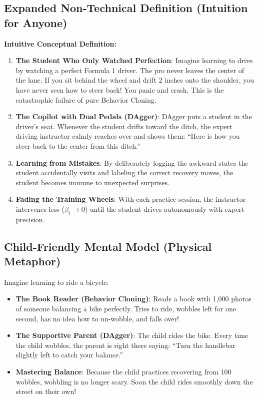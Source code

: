 \documentclass[11pt,a4paper]{article}
\theoremstyle{definition}
\begin{document}
\subsection{Expanded Non-Technical Definition (Intuition for Anyone)}
\textbf{Intuitive Conceptual Definition:}
\begin{enumerate}
    \item \textbf{The Student Who Only Watched Perfection}: Imagine learning to drive by watching a perfect Formula 1 driver. The pro never leaves the center of the lane. If you sit behind the wheel and drift 2 inches onto the shoulder, you have never seen how to steer back! You panic and crash. This is the catastrophic failure of pure Behavior Cloning.
    \item \textbf{The Copilot with Dual Pedals (DAgger)}: DAgger puts a student in the driver's seat. Whenever the student drifts toward the ditch, the expert driving instructor calmly reaches over and shows them: ``Here is how you steer back to the center from this ditch.''
    \item \textbf{Learning from Mistakes}: By deliberately logging the awkward states the student accidentally visits and labeling the correct recovery moves, the student becomes immune to unexpected surprises.
    \item \textbf{Fading the Training Wheels}: With each practice session, the instructor intervenes less ($\beta_i \to 0$) until the student drives autonomously with expert precision.
\end{enumerate}

\subsection{Child-Friendly Mental Model (Physical Metaphor)}
Imagine learning to ride a bicycle:
\begin{itemize}
    \item \textbf{The Book Reader (Behavior Cloning)}: Reads a book with 1,000 photos of someone balancing a bike perfectly. Tries to ride, wobbles left for one second, has no idea how to un-wobble, and falls over!
    \item \textbf{The Supportive Parent (DAgger)}: The child rides the bike. Every time the child wobbles, the parent is right there saying: ``Turn the handlebar slightly left to catch your balance.''
    \item \textbf{Mastering Balance}: Because the child practices recovering from 100 wobbles, wobbling is no longer scary. Soon the child rides smoothly down the street on their own!
\end{itemize}
\end{document}
